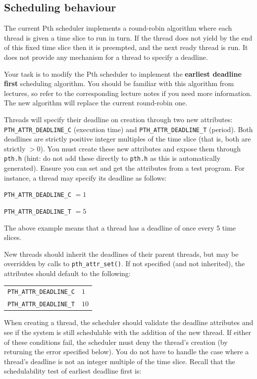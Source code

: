 \documentclass[12pt,a4paper]{article}
\begin{document}
\subsection*{Scheduling behaviour}

The current Pth scheduler implements a round-robin algorithm where each thread
is given a time slice to run in turn. If the thread does not yield by the end
of this fixed time slice then it is preempted, and the next ready thread is
run. It does not provide any mechanism for a thread to specify a deadline.

Your task is to modify the Pth scheduler to implement the \textbf{earliest
deadline first} scheduling algorithm. You should be familiar with this
algorithm from lectures, so refer to the corresponding lecture notes if you need more
information. The new algorithm will replace the current round-robin one.

Threads will specify their deadline on creation through two new attributes:
\texttt{PTH\_ATTR\_DEADLINE\_C} (execution time) and
\texttt{PTH\_ATTR\_DEADLINE\_T} (period). Both deadlines are strictly positive
integer {\color{blue}multiples of the time slice} (that is, both are strictly $> 0$). You must create these new
attributes and expose them through \texttt{pth.h} (hint: do not add these directly
to \texttt{pth.h} as this is automatically generated). Ensure you can set and get
the attributes from a test program. For instance, a thread may specify its
deadline as follows:

\texttt{PTH\_ATTR\_DEADLINE\_C} $= 1$

\texttt{PTH\_ATTR\_DEADLINE\_T} $= 5$

{\color{blue}The above example means that a thread has a deadline of once every 5 time slices.}

New threads should inherit the deadlines of their parent threads, but may be
overridden by calls to \texttt{pth\_attr\_set()}. If not specified (and not
inherited), the attributes should default to the following:

\begin{longtable}{l l}
    \toprule
    \texttt{PTH\_ATTR\_DEADLINE\_C} & $1$ \\
    \texttt{PTH\_ATTR\_DEADLINE\_T} & $10$ \\
    \bottomrule
\end{longtable}

When creating a thread, the scheduler should validate the deadline attributes
and see if the system is still schedulable with the addition of the new thread.
If either of these conditions fail, the scheduler must deny the thread's
creation (by returning the error specified below). {\color{blue}You do not have to
handle the case where a thread's deadline is not an integer multiple of the time slice.} Recall that the
schedulability test of earliest deadline first is:
\end{document}
